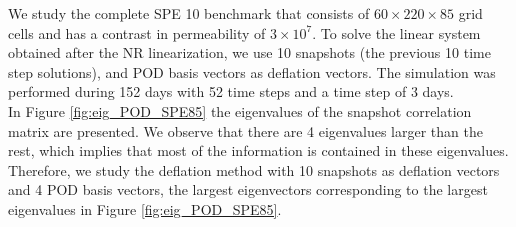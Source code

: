 \documentclass[12pt]{article}
\numberwithin{equation}{section}
\begin{document}
We study the complete SPE 10 benchmark that consists of $60\times220\times85$ grid cells and has a contrast in permeability of $3\times 10^{7}$. To solve the linear system obtained after the NR linearization, we use 10 snapshots (the previous 10 time step solutions), and POD basis vectors as deflation vectors. The simulation was performed during 152 days with 52 time steps and a time step of 3 days.\\
In Figure \ref{fig:eig_POD_SPE85} the eigenvalues of the snapshot correlation matrix are presented. We observe that there are 4 eigenvalues larger than the rest, which implies that most of the information is contained in these eigenvalues. Therefore, we study the deflation method with 10 snapshots as deflation vectors and 4 POD basis vectors, the largest eigenvectors corresponding to the largest eigenvalues in Figure \ref{fig:eig_POD_SPE85}. \\
\end{document}
